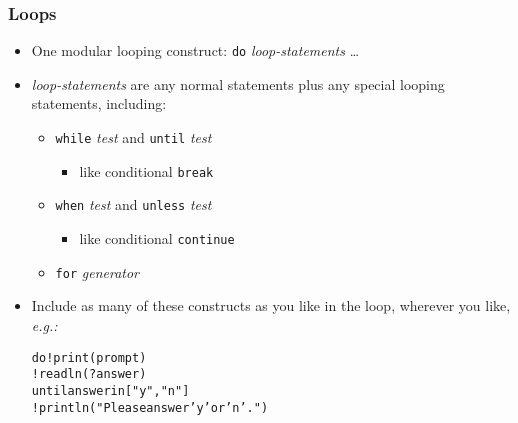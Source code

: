 \documentclass[12pt]{beamer}
\begin{document}
\begin{frame}
\frametitle{Loops}
\begin{itemize}
\item One modular looping construct: \texttt{do} \emph{loop-statements} \ldots
\item \emph{loop-statements} are any normal statements plus any
  special looping statements, including:
  \begin{itemize}
  \item \texttt{while} \emph{test} and \texttt{until} \emph{test}
    \begin{itemize}
    \item like conditional \texttt{break}
    \end{itemize}
  \item \texttt{when} \emph{test} and \texttt{unless} \emph{test}
    \begin{itemize}
    \item like conditional \texttt{continue}
    \end{itemize}
  \item \texttt{for} \emph{generator}
  \end{itemize}
\item Include as many of these constructs as you like in the loop,
  wherever you like, \emph{e.g.:} \\
\begin{alltt}
\hspace*{2em}do  !print(prompt) \\
\hspace*{3em}    !readln(?answer) \\
\hspace*{3em}    until answer in ["y","n"] \\
\hspace*{3em}    !println("Please answer 'y' or 'n'.") \\
\end{alltt}
\end{itemize}
\end{frame}
\end{document}
